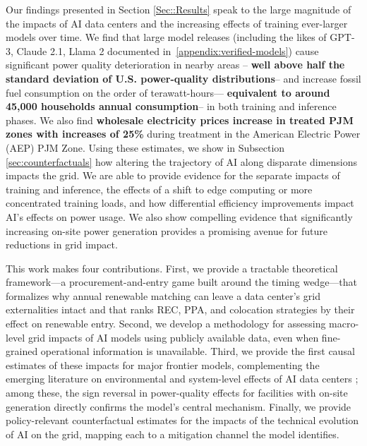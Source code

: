 \documentclass[a4paper,fleqn,longmktitle]{cas-sc}
\newcommand{\nb}[1]{\textcolor{blue}{NB[#1]}}
\newcommand{\aruna}[1]{\textcolor{blue}{Aruna[#1]}}
\theoremstyle{plain}
\theoremstyle{definition}
\begin{document}
Our findings presented in Section \ref{Sec::Results} speak to the large magnitude of the impacts of AI data centers and the increasing effects of training ever-larger models over time. We find that large model releases (including the likes of GPT-3, Claude 2.1, Llama 2 documented in~\autoref{appendix:verified-models}) 
cause significant power quality deterioration in nearby areas -- \textbf{well above half the standard deviation of U.S. power-quality distributions}-- and increase fossil fuel consumption on the order of terawatt-hours--- \textbf{equivalent to around 45,000 households annual consumption}-- in both training and inference phases. We also find \textbf{wholesale electricity prices increase in treated PJM zones with increases of 25\%} during treatment in the American Electric Power (AEP) PJM Zone.
Using these estimates, we show in Subsection \ref{sec:counterfactuals} how altering the trajectory of AI along disparate dimensions impacts the grid. We are able to provide evidence for the separate impacts of training and inference, the effects of a shift to edge computing or more concentrated training loads, and how differential efficiency improvements impact AI's effects on power usage. We also show compelling evidence that significantly increasing on-site power generation provides a promising avenue for future reductions in grid impact.

This work makes four contributions. First, we provide a tractable theoretical framework---a procurement-and-entry game built around the timing wedge---that formalizes why annual renewable matching can leave a data center's grid externalities intact and that ranks REC, PPA, and colocation strategies by their effect on renewable entry. Second, we develop a methodology for assessing macro-level grid impacts of AI models using publicly available data, even when fine-grained operational information is unavailable. Third, we provide the first causal estimates of these impacts for major frontier models, complementing the emerging literature on environmental and system-level effects of AI data centers \cite{murino2023sustainable, guidi2024environmental, thangam2024impact}; among these, the sign reversal in power-quality effects for facilities with on-site generation directly confirms the model's central mechanism. Finally, we provide policy-relevant counterfactual estimates for the impacts of the technical evolution of AI on the grid, mapping each to a mitigation channel the model identifies.
\end{document}

